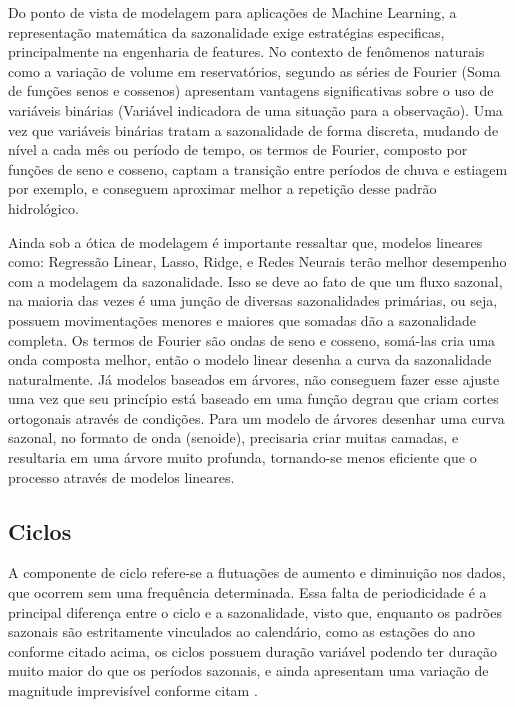 Do ponto de vista de modelagem para aplicações de Machine Learning, a representação matemática da sazonalidade exige estratégias especificas, principalmente na engenharia de features. No contexto de fenômenos naturais como a variação de volume em reservatórios, segundo \textcite{Hyndman_Athanassopoulos} as séries de Fourier (Soma de funções senos e cossenos) apresentam vantagens significativas sobre o uso de variáveis binárias (Variável indicadora de uma situação para a observação). Uma vez que variáveis binárias tratam a sazonalidade de forma discreta, mudando de nível a cada mês ou período de tempo, os termos de Fourier, composto por funções de seno e cosseno, captam a transição entre períodos de chuva e estiagem por exemplo, e conseguem aproximar melhor a repetição desse padrão hidrológico.   

Ainda sob a ótica de modelagem é importante ressaltar que, modelos lineares como: Regressão Linear, Lasso, Ridge, e Redes Neurais terão melhor desempenho com a modelagem da sazonalidade. Isso se deve ao fato de que um fluxo sazonal, na maioria das vezes é uma junção de diversas sazonalidades primárias, ou seja, possuem movimentações menores e maiores que somadas dão a sazonalidade completa. Os termos de Fourier são ondas de seno e cosseno, somá-las cria uma onda composta melhor, então o modelo linear desenha a curva da sazonalidade naturalmente. Já modelos baseados em árvores, não conseguem fazer esse ajuste uma vez que seu princípio está baseado em uma função degrau que criam cortes ortogonais através de condições. Para um modelo de árvores desenhar uma curva sazonal, no formato de onda (senoide), precisaria criar muitas camadas, e resultaria em uma árvore muito profunda, tornando-se menos eficiente que o processo através de modelos lineares.    

\subsection{Ciclos}

A componente de ciclo refere-se a flutuações de aumento e diminuição nos dados, que ocorrem sem uma frequência determinada.  Essa falta de periodicidade é a principal diferença entre o ciclo e a sazonalidade, visto que, enquanto os padrões sazonais são estritamente vinculados ao calendário, como as estações do ano conforme citado acima, os ciclos possuem duração variável podendo ter duração muito maior do que os períodos sazonais, e ainda apresentam uma variação de magnitude imprevisível conforme citam \cite{Hyndman_Athanassopoulos}.  

